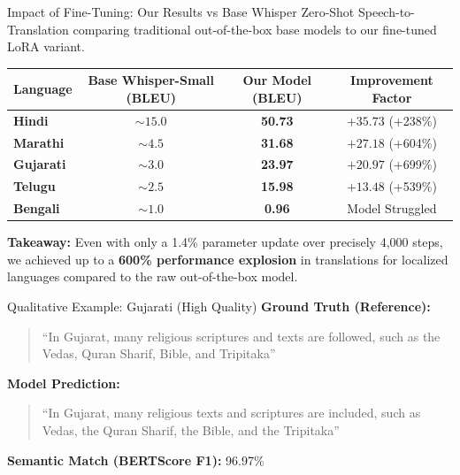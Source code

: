 \documentclass[aspectratio=169]{beamer}
\begin{document}
\begin{frame}{Impact of Fine-Tuning: Our Results vs Base Whisper}
    Zero-Shot Speech-to-Translation comparing traditional out-of-the-box base models to our fine-tuned LoRA variant.
    \vspace{0.3cm}
    
    \begin{table}[]
    \centering
    \begin{tabular}{@{}lccc@{}}
    \toprule
    \textbf{Language} & \textbf{Base Whisper-Small (BLEU)} & \textbf{Our Model (BLEU)} & \textbf{Improvement Factor} \\ \midrule
    \textbf{Hindi}    & $\sim 15.0$ & \textbf{50.73} & \textcolor{green!70!black}{$+ 35.73$ (+238\%)} \\
    \textbf{Marathi}  & $\sim 4.5$  & \textbf{31.68} & \textcolor{green!70!black}{$+ 27.18$ (+604\%)} \\
    \textbf{Gujarati} & $\sim 3.0$  & \textbf{23.97} & \textcolor{green!70!black}{$+ 20.97$ (+699\%)} \\
    \textbf{Telugu}   & $\sim 2.5$  & \textbf{15.98} & \textcolor{green!70!black}{$+ 13.48$ (+539\%)} \\
    \textbf{Bengali}  & $\sim 1.0$  & \textbf{0.96}  & Model Struggled \\ \bottomrule
    \end{tabular}
    \end{table}

    \vspace{0.2cm}
    \small \textbf{Takeaway:} Even with only a 1.4\% parameter update over precisely 4,000 steps, we achieved up to a \textbf{600\% performance explosion} in translations for localized languages compared to the raw out-of-the-box model.
\end{frame}

\begin{frame}{Qualitative Example: Gujarati (High Quality)}
    \textbf{Ground Truth (Reference):}
    \begin{quote}
    ``In Gujarat, many religious scriptures and texts are followed, such as the Vedas, Quran Sharif, Bible, and Tripitaka''
    \end{quote}
    
    \textbf{Model Prediction:}
    \begin{quote}
    ``In Gujarat, many religious texts and scriptures are included, such as Vedas, the Quran Sharif, the Bible, and the Tripitaka''
    \end{quote}
    
    \vspace{0.3cm}
    \textbf{Semantic Match (BERTScore F1):} \textcolor{green!70!black}{96.97\%}
\end{frame}
\end{document}
